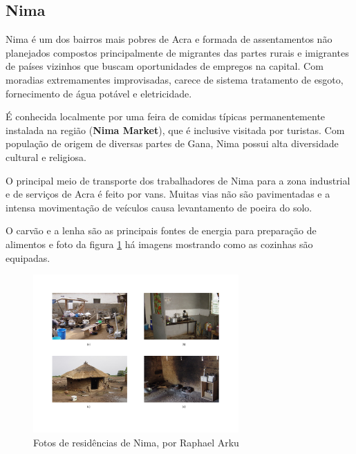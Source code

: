 \subsection{Nima}

Nima é um dos bairros mais pobres de Acra e formada de assentamentos não 
planejados compostos principalmente de migrantes das partes rurais e 
imigrantes de países vizinhos que buscam oportunidades de empregos na capital. 
Com moradias extremamentes improvisadas, carece de sistema tratamento de esgoto, 
fornecimento de água potável e eletricidade. 

É conhecida localmente por uma feira de comidas típicas permanentemente 
instalada na região (\textbf{Nima Market}), que é inclusive visitada por turistas.
Com população de origem de diversas partes de Gana, Nima possui 
alta diversidade cultural e religiosa.

O principal meio de transporte dos trabalhadores de Nima para a zona industrial
e de serviços de Acra é feito por vans. 
Muitas vias não são pavimentadas e a intensa movimentação de veículos causa 
levantamento de poeira do solo.

O carvão e a lenha são as principais fontes de energia para preparação de 
alimentos e foto da figura \ref{fig:nima} há imagens mostrando como as cozinhas
são equipadas. 

\begin{figure}[H]
  \centering
    \includegraphics[width=0.7\textwidth]{../inputs/images/zheng/nima.pdf}
    \caption{Fotos de residências de Nima, por Raphael Arku \label{fig:nima}}
\end{figure}
